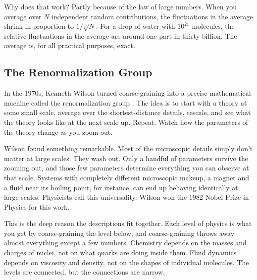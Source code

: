 Why does that work? Partly because of the law of large numbers. When you average over \(N\) independent random contributions, the fluctuations in the average shrink in proportion to \(1/\sqrt{N}\). For a drop of water with \(10^{21}\) molecules, the relative fluctuations in the average are around one part in thirty billion. The average is, for all practical purposes, exact.

\subsection{The Renormalization Group}

In the 1970s, Kenneth Wilson turned coarse-graining into a precise mathematical machine called the renormalization group \cite{wilson1975}. The idea is to start with a theory at some small scale, average over the shortest-distance details, rescale, and see what the theory looks like at the next scale up. Repeat. Watch how the parameters of the theory change as you zoom out.

Wilson found something remarkable. Most of the microscopic details simply don't matter at large scales. They wash out. Only a handful of parameters survive the zooming out, and those few parameters determine everything you can observe at that scale. Systems with completely different microscopic makeup, a magnet and a fluid near its boiling point, for instance, can end up behaving identically at large scales. Physicists call this universality. Wilson won the 1982 Nobel Prize in Physics for this work.

This is the deep reason the descriptions fit together. Each level of physics is what you get by coarse-graining the level below, and coarse-graining throws away almost everything except a few numbers. Chemistry depends on the masses and charges of nuclei, not on what quarks are doing inside them. Fluid dynamics depends on viscosity and density, not on the shapes of individual molecules. The levels are connected, but the connections are narrow.


